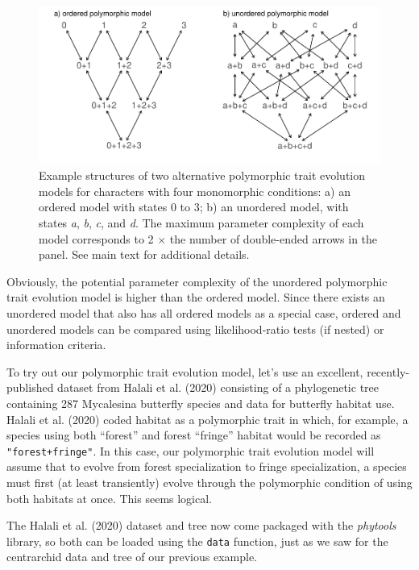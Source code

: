 \documentclass[fleqn,10pt,lineno]{wlpeerj} %
\begin{document}
\begin{figure}
\includegraphics[width=1\linewidth]{Revell.phytools-v2_peerj_files/figure-latex/structure-polyMk-1} \caption{Example structures of two alternative polymorphic trait evolution models for characters with four monomorphic conditions: a) an ordered model with states 0 to 3; b) an unordered model, with states \textit{a}, \textit{b}, \textit{c}, and \textit{d}. The maximum parameter complexity of each model corresponds to 2 $\times$ the number of double-ended arrows in the panel. See main text for additional details.}\label{fig:structure-polyMk}
\end{figure}

Obviously, the potential parameter complexity of the unordered polymorphic trait evolution model is higher than the ordered model. Since there exists an unordered model that also has all ordered models as a special case, ordered and unordered models can be compared using likelihood-ratio tests (if nested) or information criteria.

To try out our polymorphic trait evolution model, let's use an excellent, recently-published dataset from Halali et al. (2020) consisting of a phylogenetic tree containing 287 Mycalesina butterfly species and data for butterfly habitat use. Halali et al. (2020) coded habitat as a polymorphic trait in which, for example, a species using both ``forest'' and forest ``fringe'' habitat would be recorded as \texttt{"forest+fringe"}. In this case, our polymorphic trait evolution model will assume that to evolve from forest specialization to fringe specialization, a species must first (at least transiently) evolve through the polymorphic condition of using both habitats at once. This seems logical.

The Halali et al. (2020) dataset and tree now come packaged with the \emph{phytools} library, so both can be loaded using the \texttt{data} function, just as we saw for the centrarchid data and tree of our previous example.
\end{document}
